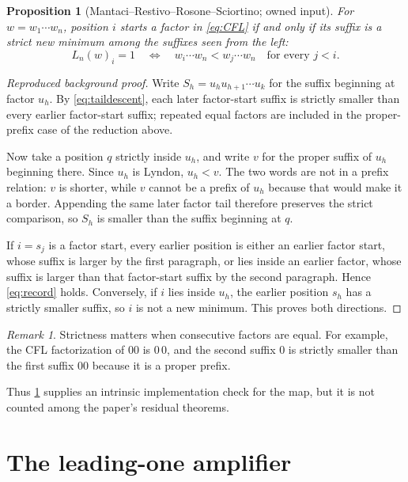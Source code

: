 \documentclass[10pt,a4paper]{amsart}
\newtheorem{proposition}[theorem]{Proposition}
\theoremstyle{definition}
\theoremstyle{remark}
\newtheorem{remark}[theorem]{Remark}
\begin{document}
\begin{proposition}[Mantaci--Restivo--Rosone--Sciortino; owned input]
\label{prop:records}
For $w=w_1\cdots w_n$, position $i$ starts a factor in \eqref{eq:CFL} if and
only if its suffix is a strict new minimum among the suffixes seen from the
left:
\begin{equation}\label{eq:record}
 L_n(w)_i=1
 \quad\Longleftrightarrow\quad
 w_i\cdots w_n<w_j\cdots w_n\quad\text{for every }j<i.
\end{equation}
\end{proposition}

\begin{proof}[Reproduced background proof]
Write $S_h=u_hu_{h+1}\cdots u_k$ for the suffix beginning at factor $u_h$.
By \eqref{eq:taildescent}, each later factor-start suffix is strictly smaller
than every earlier factor-start suffix; repeated equal factors are included
in the proper-prefix case of the reduction above.

Now take a position $q$ strictly inside $u_h$, and write $v$ for the proper
suffix of $u_h$ beginning there.  Since $u_h$ is Lyndon, $u_h<v$.  The two
words are not in a prefix relation: $v$ is shorter, while $v$ cannot be a
prefix of $u_h$ because that would make it a border.  Appending the same later
factor tail therefore preserves the strict comparison, so $S_h$ is smaller
than the suffix beginning at $q$.

If $i=s_j$ is a factor start, every earlier position is either an earlier
factor start, whose suffix is larger by the first paragraph, or lies inside
an earlier factor, whose suffix is larger than that factor-start suffix by the
second paragraph.  Hence \eqref{eq:record} holds.  Conversely, if $i$ lies
inside $u_h$, the earlier position $s_h$ has a strictly smaller suffix, so
$i$ is not a new minimum.  This proves both directions.
\end{proof}

\begin{remark}
Strictness matters when consecutive factors are equal.  For example, the CFL
factorization of $00$ is $0\,0$, and the second suffix $0$ is strictly smaller
than the first suffix $00$ because it is a proper prefix.
\end{remark}

Thus \cref{prop:records} supplies an intrinsic implementation check for the
map, but it is not counted among the paper's residual theorems.

\section{The leading-one amplifier}
\end{document}
